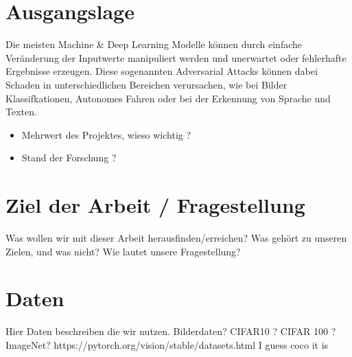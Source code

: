 \section{Ausgangslage}
Die meisten Machine \& Deep Learning Modelle können durch einfache Veränderung der Inputwerte manipuliert werden und unerwartet oder fehlerhafte Ergebnisse erzeugen. Diese sogenannten Adversarial Attacks können dabei Schaden in unterschiedlichen Bereichen verursachen, wie bei Bilder Klassifkationen, Autonomes Fahren oder bei der Erkennung von Sprache und Texten. 

\begin{itemize}
    \item Mehrwert des Projektes, wieso wichtig ?
    \item Stand der Forschung ?
\end{itemize}

\section{Ziel der Arbeit / Fragestellung}
Was wollen wir mit dieser Arbeit herausfinden/erreichen?
Was gehört zu unseren Zielen, und was nicht?
Wie lautet unsere Fragestellung?

\section{Daten}
Hier Daten beschreiben die wir nutzen.
Bilderdaten?
CIFAR10 ? CIFAR 100 ? ImageNet? 
https://pytorch.org/vision/stable/datasets.html
I guess coco it is

